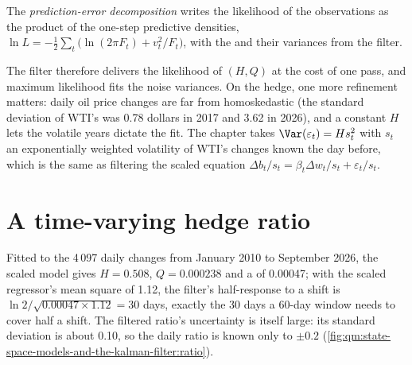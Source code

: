 \begin{definition}\label{def:qm:state-space-models-and-the-kalman-filter:ped}
The \emph{prediction-error decomposition} writes the likelihood of the observations as the product of the one-step
predictive densities, $\ln L = -\frac12\sum_t\bigl(\ln(2\pi F_t) + v_t^2/F_t\bigr)$, with the  and their variances from the filter.
\end{definition}

The filter therefore delivers the likelihood of $(H, Q)$ at the cost of one pass, and maximum likelihood fits the noise variances. On the hedge, one more
refinement matters: daily oil price changes are far from homoskedastic (the standard deviation of WTI's was 0.78 dollars in 2017 and 3.62 in 2026), and a
constant $H$ lets the volatile years dictate the fit. The chapter takes $\Var(\varepsilon_t) = H s_t^2$ with $s_t$ an exponentially weighted volatility of
WTI's changes known the day before, which is the same as filtering the scaled equation $\Delta b_t/s_t = \beta_t\Delta w_t/s_t + \varepsilon_t/s_t$.

\section{A time-varying hedge ratio}

Fitted to the 4\,097 daily changes from January 2010 to September 2026, the scaled model gives $H = 0.508$, $Q = 0.000238$ and a  of
0.00047; with the scaled regressor's mean square of 1.12, the filter's half-response to a shift is $\ln2/\sqrt{0.00047 \times 1.12} = 30$ days, exactly the
30 days a 60-day window needs to cover half a shift. The filtered ratio's uncertainty is itself large: its standard deviation is about 0.10, so the daily
ratio is known only to $\pm 0.2$ (\cref{fig:qm:state-space-models-and-the-kalman-filter:ratio}).

